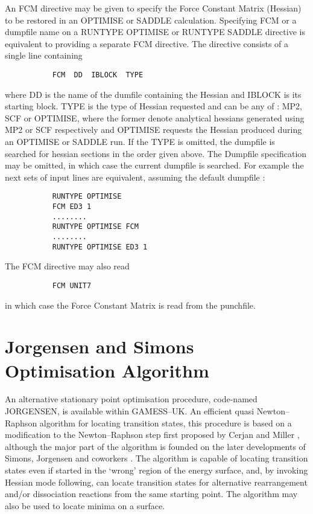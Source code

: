 \documentclass[11pt,fleqn]{article}
\begin{document}
An FCM directive may be given to specify the Force Constant Matrix (Hessian) to be restored
in an OPTIMISE or SADDLE calculation. Specifying FCM or a dumpfile name on a RUNTYPE OPTIMISE
or RUNTYPE SADDLE directive is equivalent to providing a separate FCM directive.
The directive consists of a single line containing
\begin{verbatim}
           FCM  DD  IBLOCK  TYPE
\end{verbatim}
where DD is the name of the dumfile containing the Hessian and IBLOCK is its starting block.
TYPE is the type of Hessian requested and can be any of : MP2, SCF or OPTIMISE, where the
former denote analytical hessians generated using MP2 or SCF respectively and OPTIMISE 
requests the Hessian produced during an OPTIMISE or SADDLE run. If the TYPE is omitted,
the dumpfile is searched for hessian sections in the order given above. The Dumpfile 
specification may be omitted, in which case the current dumpfile is searched.
For example the next sets of input lines are equivalent, assuming the default dumpfile :
{
\footnotesize
\begin{verbatim}
           RUNTYPE OPTIMISE
           FCM ED3 1
           ........
           RUNTYPE OPTIMISE FCM
           ........
           RUNTYPE OPTIMISE ED3 1
\end{verbatim}
}
The FCM directive may also read
{
\footnotesize
\begin{verbatim}
           FCM UNIT7
\end{verbatim}
}
in which case the Force Constant Matrix is read from the punchfile.
 


\section{Jorgensen and Simons Optimisation Algorithm}

An alternative  stationary point optimisation procedure, 
code-named JORGENSEN, is available within GAMESS--UK.
An efficient quasi 
Newton--Raphson algorithm for locating transition states, 
this  procedure is based on a modification to the Newton--Raphson 
step first proposed by Cerjan and Miller \cite{cerjan}, 
although the major 
part of the algorithm is founded on the later developments of Simons, 
Jorgensen and coworkers \cite{simons}. 
The algorithm is capable of locating transition states 
even if started in the `wrong' region of the energy surface, and, by 
invoking Hessian mode following, can locate transition states for 
alternative rearrangement and/or dissociation reactions from the same 
starting point. The algorithm may also be used to locate minima on a 
surface.
\end{document}
